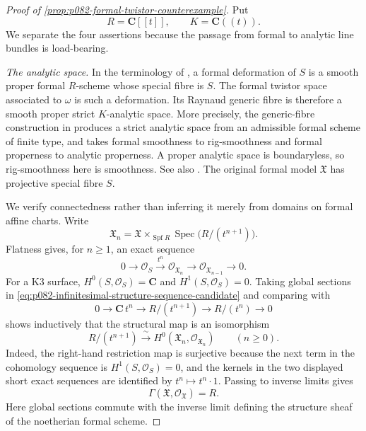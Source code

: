 \begin{proof}[Proof of
\cref{prop:p082-formal-twistor-counterexample}]
Put
\[
                 R=\mathbf C[[t]],\qquad K=\mathbf C((t)).
\]
We separate the four assertions because the passage from formal to analytic
line bundles is load-bearing.

\emph{The analytic space.}
In the terminology of \cite[\S2.1]{HMS09Orientation}, a formal deformation
of $S$ is a smooth proper formal $R$-scheme whose special fibre is
$S$.  The formal twistor space associated to $\omega$ is such a
deformation.  Its Raynaud generic fibre is therefore a smooth proper strict
$K$-analytic space.  More precisely, the generic-fibre construction in
\cite[\S5.2.2]{Temkin12Introduction} produces a strict analytic space from
an admissible formal scheme of finite type, and
\cite[Fact~5.2.2.4]{Temkin12Introduction} takes formal smoothness to
rig-smoothness and formal properness to analytic properness.  A proper
analytic space is boundaryless, so rig-smoothness here is smoothness.  See
also \cite[Introduction and Remark~2.2]{HMS11FormalFibre}.  The original
formal model $\mathfrak X$ has projective special fibre $S$.

We verify connectedness rather than inferring it merely from domains on
formal affine charts.  Write
\[
  \mathfrak X_n
   =\mathfrak X\times_{\operatorname{Spf}R}\operatorname{Spec}
        \bigl(R/(t^{n+1})\bigr).
\]
Flatness gives, for $n\geq 1$, an exact sequence
\begin{equation}\label{eq:p082-infinitesimal-structure-sequence-candidate}
  0\longrightarrow \mathcal O_S
   \xrightarrow{\ t^n\ }
   \mathcal O_{\mathfrak X_n}
   \longrightarrow \mathcal O_{\mathfrak X_{n-1}}
   \longrightarrow 0.
\end{equation}
For a K3 surface,
$H^0(S,\mathcal O_S)=\mathbf C$ and
$H^1(S,\mathcal O_S)=0$.  Taking global sections in
\eqref{eq:p082-infinitesimal-structure-sequence-candidate} and comparing
with
\[
  0\longrightarrow \mathbf C\,t^n
   \longrightarrow R/(t^{n+1})
   \longrightarrow R/(t^n)
   \longrightarrow 0
\]
shows inductively that the structural map is an isomorphism
\begin{equation}\label{eq:p082-infinitesimal-global-functions-candidate}
       R/(t^{n+1})
          \xrightarrow{\ \sim\ }
       H^0(\mathfrak X_n,\mathcal O_{\mathfrak X_n})
       \qquad(n\geq0).
\end{equation}
Indeed, the right-hand restriction map is surjective because the next term
in the cohomology sequence is $H^1(S,\mathcal O_S)=0$, and the kernels in
the two displayed short exact sequences are identified by $t^n\mapsto
t^n\cdot1$.  Passing to inverse limits gives
\begin{equation}\label{eq:p082-formal-global-functions-candidate}
                \Gamma(\mathfrak X,\mathcal O_{\mathfrak X})=R.
\end{equation}
Here global sections commute with the inverse limit defining the structure
sheaf of the noetherian formal scheme.


\end{proof}
